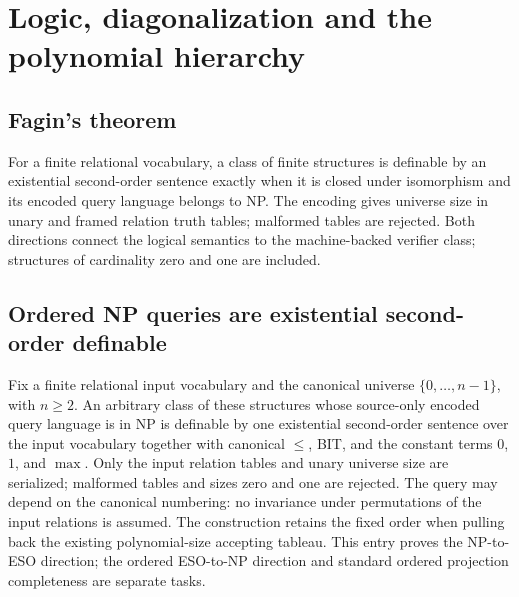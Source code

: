 \section{Logic, diagonalization and the polynomial hierarchy}

\begin{result}
\subsection{Fagin's theorem}
For a finite relational vocabulary, a class of finite structures is definable
by an existential second-order sentence exactly when it is closed under
isomorphism and its encoded query language belongs to NP. The encoding gives
universe size in unary and framed relation truth tables; malformed tables are
rejected. Both directions
connect the logical semantics to the machine-backed verifier class; structures
of cardinality zero and one are included.\citep{Fagin1974,Immerman1999}
\end{result}

\begin{result}
\subsection{Ordered NP queries are existential second-order definable}
Fix a finite relational input vocabulary and the canonical universe
$\{0,\ldots,n-1\}$, with $n\geq2$. An arbitrary class of these structures whose
source-only encoded query language is in NP is definable by one existential
second-order sentence over the input vocabulary together with canonical
$\leq$, BIT, and the constant terms $0$, $1$, and $\max$.
Only the input relation tables and unary universe size are serialized;
malformed tables and sizes zero and one are rejected. The query may depend
on the canonical numbering: no invariance under permutations of the input
relations is assumed. The construction retains the fixed order when pulling
back the existing polynomial-size accepting tableau. This entry proves the
NP-to-ESO direction; the ordered ESO-to-NP direction and standard ordered
projection completeness are separate tasks.\citep{Fagin1974,Immerman1999}
\end{result}

